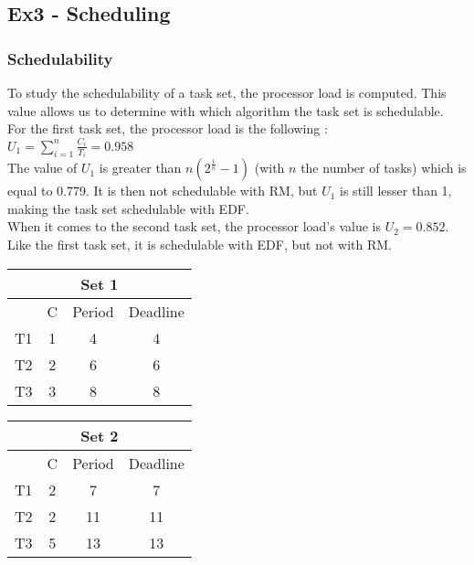 \subsection{Ex3 - Scheduling}

\subsubsection{Schedulability}

To study the schedulability of a task set, the processor load is computed. This value allows us to determine with which algorithm the task set is schedulable. \\

\noindent For the first task set, the processor load is the following : \\

$U_1 = \sum_{i=1}^{n} \frac{C_i}{T_i} = 0.958$ \\

The value of $U_1$ is greater than $n(2^{\frac{1}{n}}-1)$ (with $n$ the number of tasks) which is equal to 0.779. It is then not schedulable with RM, but $U_1$ is still lesser than 1, making the task set schedulable with EDF. \\

When it comes to the second task set, the processor load's value is $U_2 = 0.852$. Like the first task set, it is schedulable with EDF, but not with RM. \\

\begin{center}
	\begin{tabular}{|c|c|c|c|}
		\hline
		\multicolumn{4}{|c|}{\textbf{Set 1}} \\
		\hline
		\, & C & Period & Deadline \\
		\hline
		T1 & 1 & 4 & 4 \\
		\hline
		T2 & 2 & 6 & 6 \\
		\hline
		T3 & 3 & 8 & 8 \\
		\hline
	\end{tabular}
	\quad
	\begin{tabular}{|c|c|c|c|}
		\hline
		\multicolumn{4}{|c|}{\textbf{Set 2}} \\
		\hline
		\, & C & Period & Deadline \\
		\hline
		T1 & 2 & 7 & 7 \\
		\hline
		T2 & 2 & 11 & 11 \\
		\hline
		T3 & 5 & 13 & 13 \\
		\hline
	\end{tabular}
\end{center}

